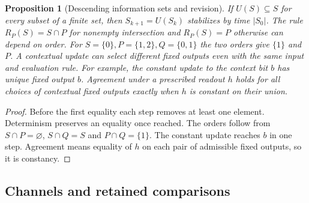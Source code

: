 \documentclass[aps,pra,onecolumn,superscriptaddress,nofootinbib,10pt]{revtex4-2}
\newtheorem{proposition}[theorem]{Proposition}
\theoremstyle{definition}
\theoremstyle{remark}
\begin{document}
\begin{proposition}[Descending information sets and revision]\label{ob:finiterevision}
If $U(S)\subseteq S$ for every subset of a finite set, then
$S_{k+1}=U(S_k)$ stabilizes by time $|S_0|$. The rule
$R_P(S)=S\cap P$ for nonempty intersection and $R_P(S)=P$ otherwise
can depend on order. For $S=\{0\},P=\{1,2\},Q=\{0,1\}$ the two orders
give $\{1\}$ and $P$. A contextual update can select different fixed
outputs even with the same input and evaluation rule. For example,
the constant update to the context bit $b$ has unique fixed output $b$.
Agreement under a prescribed readout $h$ holds for all choices of
contextual fixed outputs exactly when $h$ is constant on their union.
\end{proposition}
\begin{proof}
Before the first equality each step removes at least one element.
Determinism preserves an equality once reached. The orders follow
from $S\cap P=\varnothing$, $S\cap Q=S$ and $P\cap Q=\{1\}$.
The constant update reaches $b$ in one step. Agreement means equality
of $h$ on each pair of admissible fixed outputs, so it is constancy.
\end{proof}

\subsection{Channels and retained comparisons}\label{ob:channels}
\end{document}
